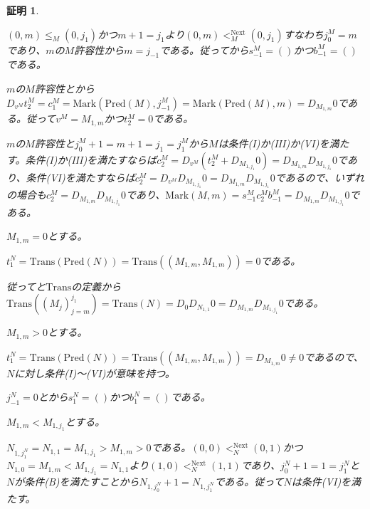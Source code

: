 \documentclass[dvipdfmx,uplatex]{jsarticle}
\theoremstyle{customnonumberbreakfortheorem}
\theoremstyle{customnonumberbreakforproof}
\newtheorem{hideableproof}{証明}
\begin{document}
\begin{hideableproof}
\begin{indented}
\begin{indented}
			\item \((0,m) \leq_M (0,j_1)\)かつ\(m+1=j_1\)より\((0,m) <_M^{\textrm{Next}} (0,j_1)\)すなわち\(j_0^M = m\)であり、\(m\)の\(M\)許容性から\(m = j_{-1}\)である。従ってから\(s_{-1}^M = ()\)かつ\(b_{-1}^M = ()\)である。
			\item \(m\)の\(M\)許容性とから\(D_{v^M} t_2^M = c_1^M = \textrm{Mark}(\textrm{Pred}(M),j_{-1}^M) = \textrm{Mark}(\textrm{Pred}(M),m) = D_{M_{1,m}} 0\)である。従って\(v^M = M_{1,m}\)かつ\(t_2^M = 0\)である。
			\item \(m\)の\(M\)許容性と\(j_0^M+1 = m+1 = j_1 = j_1^M\)から\(M\)は条件(I)か(III)か(VI)を満たす。条件(I)か(III)を満たすならば\(c_2^M = D_{v^M}(t_2^M + D_{M_{1,j_1}} 0) = D_{M_{1,m}} D_{M_{1,j_1}} 0\)であり、条件(VI)を満たすならば\(c_2^M = D_{v^M} D_{M_{1,j_1}} 0 = D_{M_{1,m}} D_{M_{1,j_1}} 0\)であるので、いずれの場合も\(c_2^M = D_{M_{1,m}} D_{M_{1,j_1}} 0\)であり、\(\textrm{Mark}(M,m) = s_{-1}^M c_2^M b_{-1}^M = D_{M_{1,m}} D_{M_{1,j_1}} 0\)である。
			\item \(M_{1,m} = 0\)とする。
			\begin{indented}
				\item \(t_1^N = \textrm{Trans}(\textrm{Pred}(N)) = \textrm{Trans}((M_{1,m},M_{1,m})) = 0\)である。
				\item 従ってと\(\textrm{Trans}\)の定義から\(\textrm{Trans}((M_j)_{j=m}^{j_1}) = \textrm{Trans}(N) = D_0 D_{N_{1,1}} 0 = D_{M_{1,m}} D_{M_{1,j_1}} 0\)である。
			\end{indented}
			\item \(M_{1,m} > 0\)とする。
			\begin{indented}
				\item \(t_1^N = \textrm{Trans}(\textrm{Pred}(N)) = \textrm{Trans}((M_{1,m},M_{1,m})) = D_{M_{1,m}} 0 \neq 0\)であるので、\(N\)に対し条件(I)～(VI)が意味を持つ。
				\item \(j_{-1}^N = 0\)とから\(s_1^N = ()\)かつ\(b_1^N = ()\)である。
				\item \(M_{1,m} < M_{1,j_1}\)とする。
				\begin{indented}
					\item \(N_{1,j_1^N} = N_{1,1} = M_{1,j_1} > M_{1,m} > 0\)である。\((0,0) <_N^{\textrm{Next}} (0,1)\)かつ\(N_{1,0} = M_{1,m} < M_{1,j_1} = N_{1,1}\)より\((1,0) <_N^{\textrm{Next}} (1,1)\)であり、\(j_0^N+1 = 1 = j_1^N\)と\(N\)が条件(B)を満たすことから\(N_{1,j_0^N}+1 = N_{1,j_1^N}\)である。従って\(N\)は条件(VI)を満たす。

\end{indented}
\end{indented}
\end{indented}
\end{indented}
\end{hideableproof}
\end{document}
